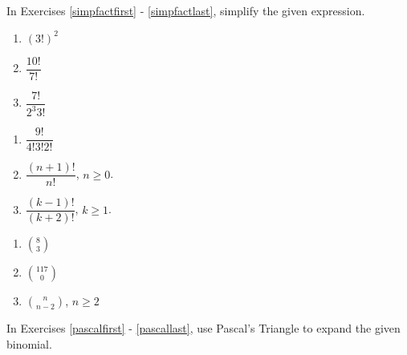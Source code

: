 \documentclass{ximera}
\begin{document}
	\author{Stitz-Zeager}


In Exercises \ref{simpfactfirst} - \ref{simpfactlast},  simplify the given expression.

\begin{multicols}{3}
\begin{enumerate}

\item  $\left(3!\right)^2$ \label{simpfactfirst}


\item  $\dfrac{10!}{7!}$


\item  $\dfrac{7!}{2^3 3!}$

\setcounter{HW}{\value{enumi}}
\end{enumerate}
\end{multicols}

\begin{multicols}{3}
\begin{enumerate}
\setcounter{enumi}{\value{HW}}



\item  $\dfrac{9!}{4! 3! 2!}$


\item  $\dfrac{(n+1)!}{n!}$, $n \geq 0$.


\item  $\dfrac{(k-1)!}{(k+2)!}$, $k \geq 1$.

\setcounter{HW}{\value{enumi}}
\end{enumerate}
\end{multicols}

\begin{multicols}{3}
\begin{enumerate}
\setcounter{enumi}{\value{HW}}



\item  $\displaystyle{\binom{8}{3}}$


\item  $\displaystyle{\binom{117}{0}}$


\item  $\displaystyle{\binom{n}{n-2}}$, $n \geq 2$ \label{simpfactlast}


\setcounter{HW}{\value{enumi}}
\end{enumerate}
\end{multicols}


In Exercises \ref{pascalfirst} - \ref{pascallast}, use Pascal's Triangle to expand the given binomial.
\end{document}
